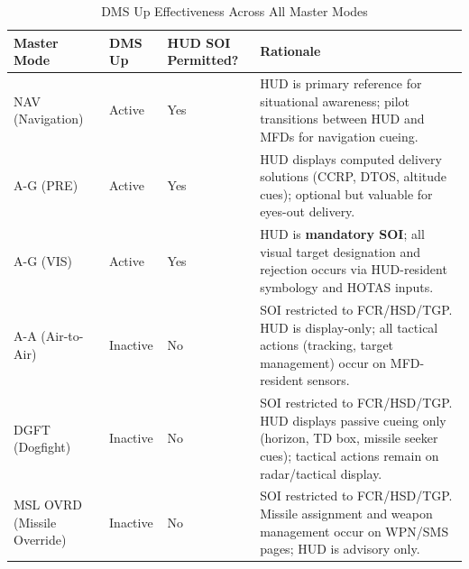 \documentclass[11pt,a4paper]{article}
\begin{document}
\begin{table}[ht]

\centering

\small

\renewcommand{\arraystretch}{1.4}

\caption{DMS Up Effectiveness Across All Master Modes}

\label{tab:C4-S2-DMS-Up-Effectiveness}

\begin{tabularx}{15.6cm}{L{2.2cm} C{1.3cm} L{5.5cm} L{6.0cm}}


\textbf{\color{white}Master Mode} & \textbf{\color{white}DMS Up} & \textbf{\color{white}HUD SOI Permitted?} & \textbf{\color{white}Rationale} \\

\midrule

NAV (Navigation) & Active & Yes & HUD is primary reference for situational awareness; pilot transitions between HUD and MFDs for navigation cueing. \\

\midrule

A-G (PRE) & Active & Yes & HUD displays computed delivery solutions (CCRP, DTOS, altitude cues); optional but valuable for eyes-out delivery. \\

\midrule

A-G (VIS) & Active & Yes & HUD is \textbf{mandatory SOI}; all visual target designation and rejection occurs via HUD-resident symbology and HOTAS inputs. \\

\midrule

A-A (Air-to-Air) & Inactive & No & SOI restricted to FCR/HSD/TGP. HUD is display-only; all tactical actions (tracking, target management) occur on MFD-resident sensors. \\

\midrule

DGFT (Dogfight) & Inactive & No & SOI restricted to FCR/HSD/TGP. HUD displays passive cueing only (horizon, TD box, missile seeker cues); tactical actions remain on radar/tactical display. \\

\midrule

MSL OVRD (Missile Override) & Inactive & No & SOI restricted to FCR/HSD/TGP. Missile assignment and weapon management occur on WPN/SMS pages; HUD is advisory only. \\

\bottomrule

\end{tabularx}

\end{table}
\end{document}
